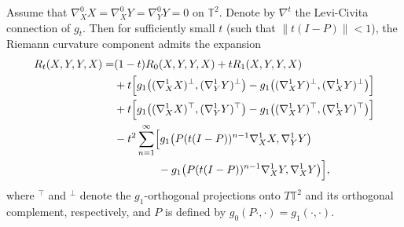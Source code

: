 \documentclass[graybox]{svmult}
\begin{document}
\begin{lemma}\label{lem:resolvetudo}
Assume that $\nabla^0_X X = \nabla^0_X Y = \nabla^0_Y Y = 0$ on $\mathbb{T}^2$. Denote by $\nabla^t$ the Levi-Civita connection of $g_t$. Then for sufficiently small $t$ (such that $\|t(I-P)\| < 1$), the Riemann curvature component admits the expansion
\begin{align}
R_t(X,Y,Y,X) =& (1-t)R_0(X,Y,Y,X) + tR_1(X,Y,Y,X) \nonumber \\
&+ t\Bigl[g_1\bigl((\nabla^1_X X)^\perp, (\nabla^1_Y Y)^\perp\bigr) 
     - g_1\bigl((\nabla^1_X Y)^\perp, (\nabla^1_X Y)^\perp\bigr)\Bigr] \nonumber \\
&+ t\Bigl[g_1\bigl((\nabla^1_X X)^\top, (\nabla^1_Y Y)^\top\bigr) 
     - g_1\bigl((\nabla^1_X Y)^\top, (\nabla^1_X Y)^\top\bigr)\Bigr] \nonumber \\
&- t^2\sum_{n=1}^\infty \Bigl[g_1\bigl(P(t(I-P))^{n-1}\nabla^1_X X, \nabla^1_Y Y\bigr) \nonumber \\
&\qquad\qquad - g_1\bigl(P(t(I-P))^{n-1}\nabla^1_X Y, \nabla^1_X Y\bigr)\Bigr],
\end{align}
where $^\top$ and $^\perp$ denote the $g_1$-orthogonal projections onto $T\mathbb{T}^2$ and its orthogonal complement, respectively, and $P$ is defined by $g_0(P\cdot,\cdot)=g_1(\cdot,\cdot)$.
\end{lemma}
\end{document}
